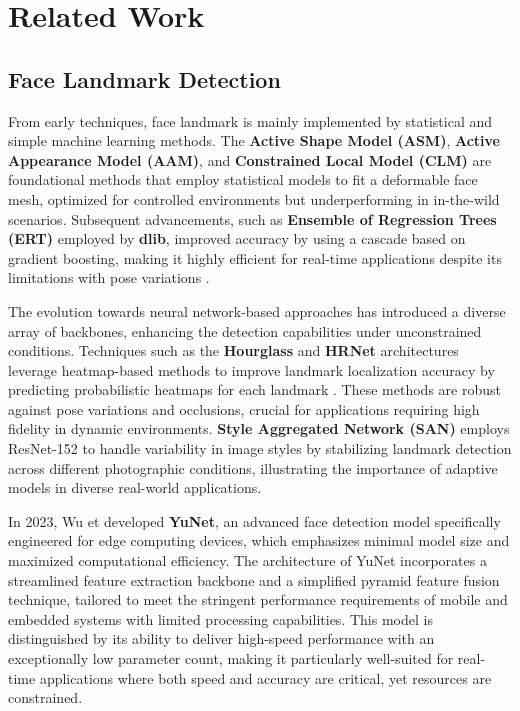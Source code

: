 \section {Related Work}
\subsection{Face  Landmark Detection}
From early techniques, face landmark is mainly implemented by statistical and simple machine learning methods. The \textbf{Active Shape Model (ASM)}, \textbf{Active Appearance Model (AAM)}, and \textbf{Constrained Local Model (CLM)} \cite{WANG201850} \cite{Khabarlak_2022} are foundational methods that employ statistical models to fit a deformable face mesh, optimized for controlled environments but underperforming in in-the-wild scenarios. Subsequent advancements, such as \textbf{Ensemble of Regression Trees (ERT)} \cite{Kazemi_2014_CVPR} employed by \textbf{dlib}, improved accuracy by using a cascade based on gradient boosting, making it highly efficient for real-time applications despite its limitations with pose variations .

The evolution towards neural network-based approaches has introduced a diverse array of backbones, enhancing the detection capabilities under unconstrained conditions. Techniques such as the \textbf{Hourglass} \cite{Newell_2016_ECCV} and \textbf{HRNet} \cite{Sun_2019_CVPR} architectures leverage heatmap-based methods to improve landmark localization accuracy by predicting probabilistic heatmaps for each landmark . These methods are robust against pose variations and occlusions, crucial for applications requiring high fidelity in dynamic environments.
\textbf{Style Aggregated Network (SAN)}\cite{Dong_2018_CVPR} employs ResNet-152 \cite{He_2016_CVPR} to handle variability in image styles by stabilizing landmark detection across different photographic conditions, illustrating the importance of adaptive models in diverse real-world applications.

In 2023, Wu et developed \textbf{YuNet}\cite{Wu_2023}, an advanced face detection model specifically engineered for edge computing devices, which emphasizes minimal model size and maximized computational efficiency. The architecture of YuNet incorporates a streamlined feature extraction backbone and a simplified pyramid feature fusion technique, tailored to meet the stringent performance requirements of mobile and embedded systems with limited processing capabilities. This model is distinguished by its ability to deliver high-speed performance with an exceptionally low parameter count, making it particularly well-suited for real-time applications where both speed and accuracy are critical, yet resources are constrained.

